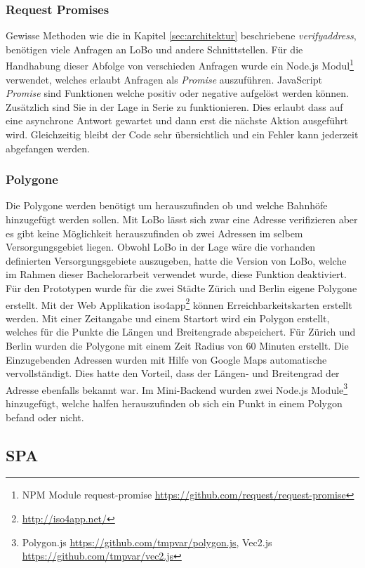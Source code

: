 \subsubsection{Request Promises}
Gewisse Methoden wie die in Kapitel \ref{sec:architektur} beschriebene \textit{verifyaddress}, benötigen viele Anfragen an LoBo und andere Schnittstellen. Für die Handhabung dieser Abfolge von verschieden Anfragen wurde ein Node.js Modul\footnote{NPM Module request-promise \url{https://github.com/request/request-promise}} verwendet, welches erlaubt Anfragen als \textit{Promise} auszuführen. JavaScript \textit{Promise} sind Funktionen welche positiv oder negative aufgelöst werden können. Zusätzlich sind Sie in der Lage in Serie zu funktionieren. Dies erlaubt dass auf eine asynchrone Antwort gewartet und dann erst die nächste Aktion ausgeführt wird. Gleichzeitig bleibt der Code sehr übersichtlich und ein Fehler kann jederzeit abgefangen werden.


\subsubsection{Polygone}
Die Polygone werden benötigt um herauszufinden ob und welche Bahnhöfe hinzugefügt werden sollen. Mit LoBo lässt sich zwar eine Adresse verifizieren aber es gibt keine Möglichkeit herauszufinden ob zwei Adressen im selbem Versorgungsgebiet liegen. Obwohl LoBo in der Lage wäre die vorhanden definierten Versorgungsgebiete auszugeben, hatte die Version von LoBo, welche im Rahmen dieser Bachelorarbeit verwendet wurde, diese Funktion deaktiviert. Für den Prototypen wurde für die zwei Städte Zürich und Berlin eigene Polygone erstellt. Mit der Web Applikation iso4app\footnote{\url{http://iso4app.net/}} können Erreichbarkeitskarten erstellt werden. Mit einer Zeitangabe und einem Startort wird ein Polygon erstellt, welches für die Punkte die Längen und Breitengrade abspeichert. Für Zürich und Berlin wurden die Polygone mit einem Zeit Radius von 60 Minuten erstellt. Die Einzugebenden Adressen wurden mit Hilfe von Google Maps automatische vervollständigt. Dies hatte den Vorteil, dass der Längen- und Breitengrad der Adresse ebenfalls bekannt war. Im Mini-Backend wurden zwei Node.js Module\footnote{Polygon.js \url{https://github.com/tmpvar/polygon.js}, Vec2.js \url{https://github.com/tmpvar/vec2.js}} hinzugefügt, welche halfen herauszufinden ob sich ein Punkt in einem Polygon befand oder nicht.


\subsection{SPA}
